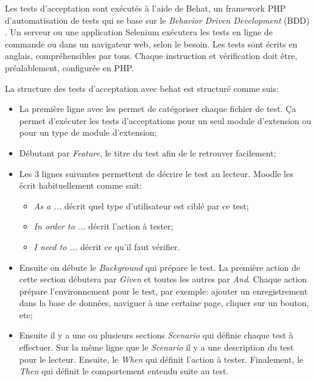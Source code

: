 Les tests d'acceptation sont exécutés à l'aide de Behat, un \og framework \fg{} PHP d'automatisation de tests qui se base sur le \og \textit{Behavior Driven Development} (BDD) \fg{}.
Un serveur ou une application Selenium exécutera les tests en ligne de commande ou dans un navigateur web, selon le besoin.
Les tests sont écrits en anglais, compréhensibles par tous.
Chaque instruction et vérification doit être, préalablement, configurée en PHP.

La structure des tests d'acceptation avec behat est structuré comme suis:

\begin{itemize}
  \item La première ligne avec les \@ permet de catégoriser chaque fichier de test.
        Ça permet d'exécuter les tests d'acceptations pour un seul module d'extension ou pour un type de module d'extension;
        
  \item Débutant par \textit{Feature}, le titre du test afin de le retrouver facilement;
  
  \item Les 3 lignes suivantes permettent de décrire le test au lecteur.
        Moodle les écrit habituellement comme suit:
        
        \begin{itemize}
          \item \og \textit{As a ...} \fg{} décrit quel type d'utilisateur est ciblé par ce test;
          \item \og \textit{In order to ...} \fg{} décrit l'action à tester;
          \item \og \textit{I need to ...} \fg{} décrit ce qu'il faut vérifier.
        \end{itemize}
        
  \item Ensuite on débute le \textit{Background} qui prépare le test.
        La première action de cette section débutera par \textit{Given} et toutes les autres par \textit{And}.
        Chaque action prépare l'environnement pour le test, par exemple: ajouter un enregistrement dans la base de données, naviguer à une certaine page, cliquer sur un bouton, etc;
        
  \item Ensuite il y a une ou plusieurs sections \textit{Scenario} qui définie chaque test à effectuer.
        Sur la même ligne que le \textit{Scenario} il y a une description du test pour le lecteur.
        Ensuite, le \textit{When} qui définit l'action à tester.
        Finalement, le \textit{Then} qui définit le comportement entendu suite au test.
\end{itemize}

